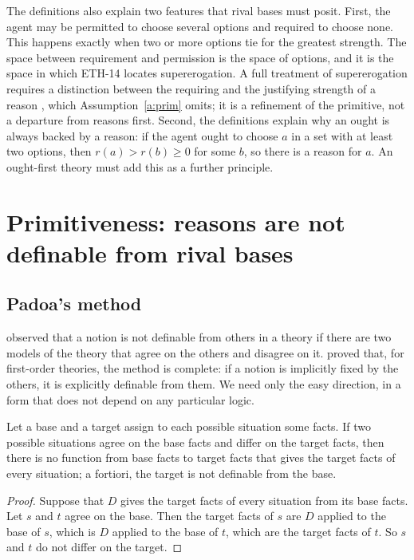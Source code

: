 \documentclass{situationist-preprint}
\begin{document}
The definitions also explain two features that rival bases must posit. First, the agent may be permitted to choose several options and required to choose none. This happens exactly when two or more options tie for the greatest strength. The space between requirement and permission is the space of options, and it is the space in which ETH-14 locates supererogation. A full treatment of supererogation requires a distinction between the requiring and the justifying strength of a reason \citep{Gert2004}, which Assumption~\ref{a:prim} omits; it is a refinement of the primitive, not a departure from reasons first. Second, the definitions explain why an ought is always backed by a reason: if the agent ought to choose $a$ in a set with at least two options, then $r(a)>r(b)\ge 0$ for some $b$, so there is a reason for $a$. An ought-first theory must add this as a further principle.

\section{Primitiveness: reasons are not definable from rival bases}\label{s:prim}

\subsection{Padoa's method}

\citet{Padoa1901} observed that a notion is not definable from others in a theory if there are two models of the theory that agree on the others and disagree on it. \citet{Beth1953} proved that, for first-order theories, the method is complete: if a notion is implicitly fixed by the others, it is explicitly definable from them. We need only the easy direction, in a form that does not depend on any particular logic.

\begin{lemma}\label{l:padoa}
Let a base and a target assign to each possible situation some facts. If two possible situations agree on the base facts and differ on the target facts, then there is no function from base facts to target facts that gives the target facts of every situation; a fortiori, the target is not definable from the base.
\end{lemma}

\begin{proof}
Suppose that $D$ gives the target facts of every situation from its base facts. Let $s$ and $t$ agree on the base. Then the target facts of $s$ are $D$ applied to the base of $s$, which is $D$ applied to the base of $t$, which are the target facts of $t$. So $s$ and $t$ do not differ on the target.
\end{proof}
\end{document}
